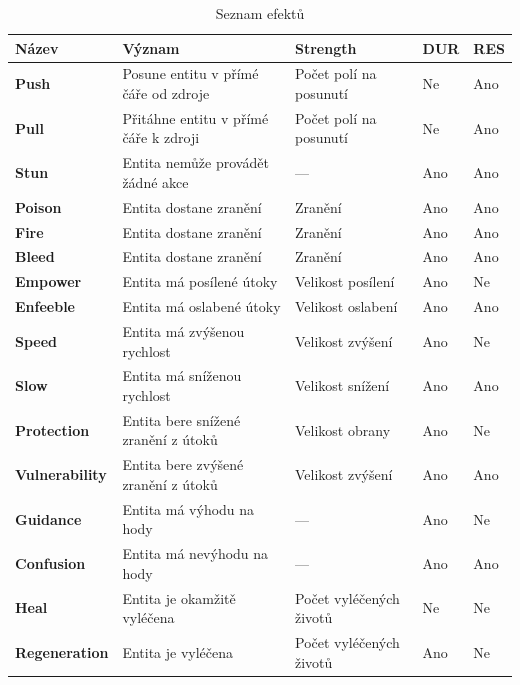 \begin{table}[H]
    \centering
    \begin{tabular}{l l l l l}
        \toprule
        
        \textbf{Název} & \textbf{Význam} & \textbf{Strength} & \textbf{DUR} & \textbf{RES} \\
        \midrule
        
        \textbf{Push} & Posune entitu v přímé čáře od zdroje & Počet polí na posunutí & Ne & Ano \\
        \textbf{Pull} & Přitáhne entitu v přímé čáře k zdroji & Počet polí na posunutí & Ne & Ano \\
        \textbf{Stun} & Entita nemůže provádět žádné akce & --- & Ano & Ano \\
        \textbf{Poison} & Entita dostane zranění & Zranění & Ano & Ano \\
        \textbf{Fire} & Entita dostane zranění & Zranění & Ano & Ano \\
        \textbf{Bleed} & Entita dostane zranění & Zranění & Ano & Ano \\
        \textbf{Empower} & Entita má posílené útoky & Velikost posílení & Ano & Ne \\
        \textbf{Enfeeble} & Entita má oslabené útoky & Velikost oslabení & Ano & Ano \\
        \textbf{Speed} & Entita má zvýšenou rychlost & Velikost zvýšení & Ano & Ne \\
        \textbf{Slow} & Entita má sníženou rychlost & Velikost snížení & Ano & Ano \\
        \textbf{Protection} & Entita bere snížené zranění z útoků & Velikost obrany & Ano & Ne \\
        \textbf{Vulnerability} & Entita bere zvýšené zranění z útoků & Velikost zvýšení & Ano & Ano \\
        \textbf{Guidance} & Entita má výhodu na hody & --- & Ano & Ne \\
        \textbf{Confusion} & Entita má nevýhodu na hody & --- & Ano & Ano \\
        \textbf{Heal} & Entita je okamžitě vyléčena & Počet vyléčených životů & Ne & Ne \\
        \textbf{Regeneration} & Entita je vyléčena & Počet vyléčených životů & Ano & Ne \\
        
        \bottomrule
    \end{tabular} 
    \caption{Seznam efektů}
    \label{tab:effects}
\end{table}

